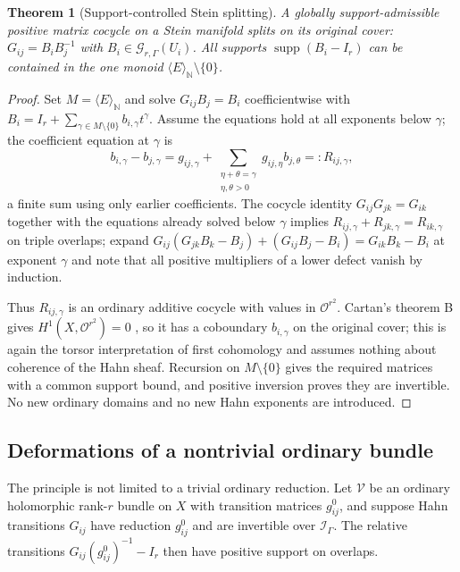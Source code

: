 \documentclass[11pt,letterpaper]{article}
\newtheorem{theorem}{Theorem}[section]
\theoremstyle{definition}
\theoremstyle{remark}
\newcommand{\N}{\mathbb N}
\newcommand{\OO}{\mathcal O}
\newcommand{\II}{\mathscr I_\Gamma}
\newcommand{\GG}{\mathscr G_{r,\Gamma}}
\newcommand{\supp}{\operatorname{supp}}
\newcommand{\angles}[1]{\langle #1\rangle_{\N}}
\numberwithin{equation}{section}
\begin{document}
\begin{theorem}[Support-controlled Stein splitting]\label{nab:thm:Stein}
A globally support-admissible positive matrix cocycle on a Stein manifold
splits on its original cover: $G_{ij}=B_iB_j^{-1}$ with $B_i\in\GG(U_i)$. All
supports $\supp(B_i-I_r)$ can be contained in the one monoid
$\angles E\setminus\{0\}$.
\end{theorem}

\begin{proof}
Set $M=\angles E$ and solve $G_{ij}B_j=B_i$ coefficientwise with
$B_i=I_r+\sum_{\gamma\in M\setminus\{0\}}b_{i,\gamma}t^\gamma$. Assume the
equations hold at all exponents below $\gamma$; the coefficient equation at
$\gamma$ is
\begin{equation}\label{nab:eq:Steinrec}
 b_{i,\gamma}-b_{j,\gamma}
 =g_{ij,\gamma}
 +\sum_{\substack{\eta+\theta=\gamma\\ \eta,\theta>0}}g_{ij,\eta}b_{j,\theta}
 =:R_{ij,\gamma},
\end{equation}
a finite sum using only earlier coefficients. The cocycle identity
$G_{ij}G_{jk}=G_{ik}$ together with the equations already solved below
$\gamma$ implies $R_{ij,\gamma}+R_{jk,\gamma}=R_{ik,\gamma}$ on triple
overlaps; expand
$G_{ij}(G_{jk}B_k-B_j)+(G_{ij}B_j-B_i)=G_{ik}B_k-B_i$ at exponent $\gamma$ and
note that all positive multipliers of a lower defect vanish by induction.

Thus $R_{ij,\gamma}$ is an ordinary additive cocycle with values in
$\OO^{r^2}$. Cartan's theorem B gives $H^1(X,\OO^{r^2})=0$
\cite{Cartan,Schmitt}, so it has a coboundary $b_{i,\gamma}$ on the original
cover; this is again the torsor interpretation of first cohomology and assumes
nothing about coherence of the Hahn sheaf. Recursion on $M\setminus\{0\}$
gives the required matrices with a common support bound, and positive
inversion proves they are invertible. No new ordinary domains and no new Hahn
exponents are introduced.
\end{proof}

\subsection{Deformations of a nontrivial ordinary bundle}

The principle is not limited to a trivial ordinary reduction. Let
$\mathcal V$ be an ordinary holomorphic rank-$r$ bundle on $X$ with transition
matrices $g^0_{ij}$, and suppose Hahn transitions $G_{ij}$ have reduction
$g^0_{ij}$ and are invertible over $\II$. The relative transitions
$G_{ij}(g^0_{ij})^{-1}-I_r$ then have positive support on overlaps.
\end{document}
